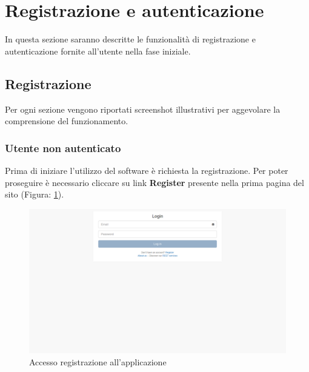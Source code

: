 %

\section{Registrazione e autenticazione} %
\label{sec:registrazione e autenticazione}
	In questa sezione saranno descritte le funzionalità di registrazione e autenticazione fornite all'utente nella fase iniziale.


	\subsection{Registrazione} %
	\label{sec:registrazione}
		Per ogni sezione vengono riportati screenshot illustrativi per aggevolare la comprensione del funzionamento.


		\subsubsection{Utente non autenticato} %
		\label{sec:utente_non_autenticati}
			Prima di iniziare l'utilizzo del software \projectName{} è richiesta la registrazione.\newline
			Per poter proseguire è necessario cliccare su link \textbf{Register} presente nella prima pagina del sito (Figura: \ref{fig:registrazione_utente_accesso}).
			\begin{figure}[htbp]
				\centering
				\centerline{\includegraphics[width=14cm]{images/registrazione_utente_accesso.png}}
				\caption{Accesso registrazione all'applicazione}
				\label{fig:registrazione_utente_accesso}
			\end{figure}



